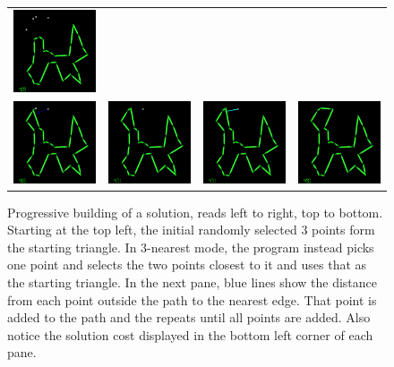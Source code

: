 \documentclass{article}
\begin{document}
\begin{figure}
\begin{center}
\begin{tabular}{cccc}
\includegraphics[width=29mm]{images/progress-07.png} \\
\includegraphics[width=29mm]{images/progress-08.png} &
\includegraphics[width=29mm]{images/progress-09.png} &
\includegraphics[width=29mm]{images/progress-10.png} &
\includegraphics[width=29mm]{images/progress-11.png} \\
\end{tabular}
\caption{Progressive building of a solution, reads left to right, top to bottom. Starting at the top left, the initial
randomly selected 3 points form the starting triangle. In 3-nearest mode, the program instead picks one point and selects
the two points closest to it and uses that as the starting triangle. In the next pane, blue lines show the distance from
each point outside the path to the nearest edge. That point is added to the path and the repeats until all points
are added. Also notice the solution cost displayed in the bottom left corner of each pane.}
\label{fig:progress}
\end{center}
\end{figure}
\end{document}
